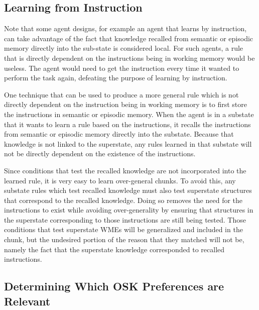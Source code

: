 \subsection{Learning from Instruction}

	Note that some agent designs, for example an agent that learns by instruction, can take advantage of the fact that knowledge recalled from semantic or episodic memory directly into the sub-state is considered local.   For such agents, a rule that is directly dependent on the instructions being in working memory would be useless.  The agent would need to get the instruction every time it wanted to perform the task again, defeating the purpose of learning by instruction.  
	
	One technique that can be used to produce a more general rule which is not directly dependent on the instruction being in working memory is to first store the instructions in semantic or episodic memory.  When the agent is in a substate that it wants to learn a rule based on the instructions, it recalls the instructions from semantic or episodic memory directly into the substate.  Because that knowledge is not linked to the superstate, any rules learned in that substate will not be directly dependent on the existence of the instructions.  
	
	Since conditions that test the recalled knowledge are not incorporated into the learned rule, it is very easy to learn over-general chunks.  To avoid this, any substate rules which test recalled knowledge must also test superstate structures that correspond to the recalled knowledge.  Doing so removes the need for the instructions to exist while avoiding over-generality by ensuring that structures in the superstate corresponding to those instructions are still being tested.  Those conditions that test superstate WMEs will be generalized and included in the chunk, but the undesired portion of the reason that they matched will not be, namely the fact that the superstate knowledge corresponded to recalled instructions.

\subsection{Determining Which OSK Preferences are Relevant}
\label{CHUNKING-subtleties-osk}

